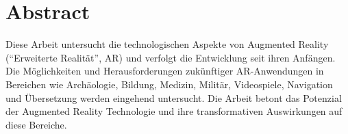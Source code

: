 
\section*{Abstract}

Diese Arbeit untersucht die technologischen Aspekte von Augmented Reality (“Erweiterte Realität”, AR) und verfolgt die Entwicklung seit ihren Anfängen. Die Möglichkeiten und Herausforderungen zukünftiger AR-Anwendungen in Bereichen wie Archäologie, Bildung, Medizin, Militär, Videospiele, Navigation und Übersetzung werden eingehend untersucht. Die Arbeit betont das Potenzial der Augmented Reality Technologie und ihre transformativen Auswirkungen auf diese Bereiche.




